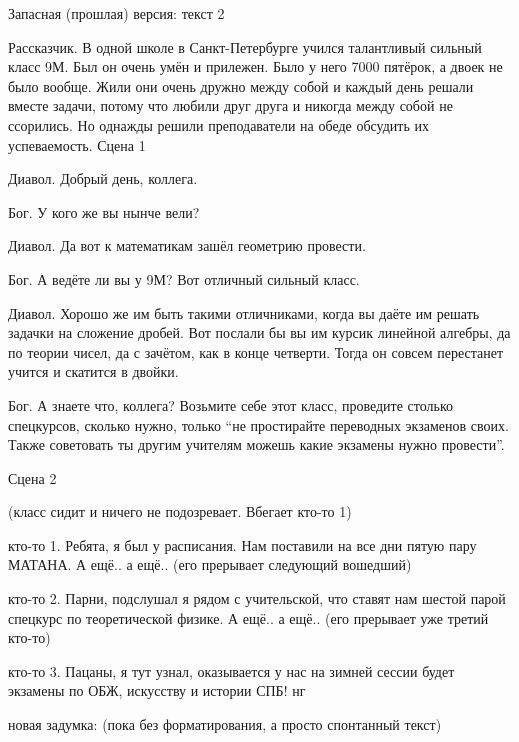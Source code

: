 \documentclass[10pt,a4paper]{article}
\begin{document}
Запасная (прошлая) версия:
текст 2

Рассказчик. В одной школе в Санкт-Петербурге учился талантливый сильный класс 9М. Был он очень умён и прилежен. Было у него 7000 пятёрок, а двоек не было вообще. Жили они очень дружно между собой и каждый день решали вместе задачи, потому что любили друг друга и никогда между собой не ссорились.
Но однажды решили преподаватели на обеде обсудить их успеваемость.
Сцена 1

Диавол. Добрый день, коллега.

Бог. У кого же вы нынче вели?

Диавол. Да вот к математикам зашёл геометрию провести.

Бог. А ведёте ли вы у 9М? Вот отличный сильный класс.

Диавол. Хорошо же им быть такими отличниками, когда вы даёте им решать задачки на 
сложение дробей. Вот послали бы вы им курсик линейной алгебры, да по теории чисел, да с зачётом, как в конце четверти. Тогда он совсем перестанет учится и скатится в двойки.

Бог. А знаете что, коллега? Возьмите себе этот класс, проведите столько спецкурсов, сколько нужно, только “не простирайте переводных экзаменов своих. Также советовать ты другим учителям можешь какие экзамены нужно провести”.

Сцена 2

(класс сидит и ничего не подозревает. Вбегает кто-то 1)

кто-то 1. Ребята, я был у расписания. Нам поставили на все дни пятую пару МАТАНА. А ещё.. а ещё.. (его прерывает следующий вошедший)

кто-то 2. Парни, подслушал я рядом с учительской, что ставят нам шестой парой спецкурс по теоретической физике. А ещё.. а ещё.. (его прерывает уже третий кто-то)

кто-то 3. Пацаны, я тут узнал, оказывается у нас на зимней сессии будет экзамены по ОБЖ, искусству и истории СПБ! нг

новая задумка: (пока без форматирования, а просто спонтанный текст)
\end{document}
